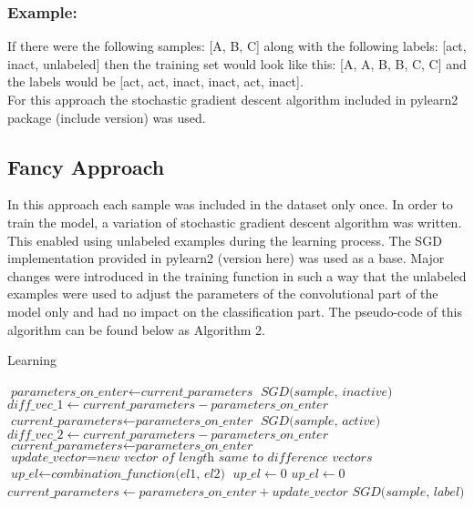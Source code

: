 \documentclass[a4paper,10pt]{report}
\begin{document}
      \subsubsection{Example:}
      If there were the following samples: [A, B, C] along with the following labels: [act, inact, unlabeled] then the training set would look like this: [A, A, B, B, C, C] and the labels would be [act, act, inact, inact, act, inact].\\
      
      For this approach the stochastic gradient descent algorithm included in pylearn2 package (include version) was used.\\
	  
      \subsection{Fancy Approach}
      In this approach each sample was included in the dataset only once. In order to train the model, a variation of stochastic gradient descent algorithm was written. This enabled using unlabeled examples during the learning process. The SGD implementation provided in pylearn2 (version here) was used as a base. Major changes were introduced in the training function in such a way that the unlabeled examples were used to adjust the parameters of the convolutional part of the model only and had no impact on the classification part. The pseudo-code of this algorithm can be found below as Algorithm 2.\\
      
      \begin{algorithm}
      \caption{Learning}\label{euclid}
      \begin{algorithmic}[1]
	\State $\textit{parameters\_on\_enter} \gets \textit{current\_parameters}$
	\State
	\State $\textit{SGD(sample, inactive)}$
	\State $\textit{diff\_vec\_1} \gets \textit{current\_parameters} -\textit{parameters\_on\_enter}$
	\State $\textit{current\_parameters} \gets \textit{parameters\_on\_enter}$
	\State
	\State $\textit{SGD(sample, active)}$
	\State $\textit{diff\_vec\_2} \gets \textit{current\_parameters} - \textit{parameters\_on\_enter}$
	\State $\textit{current\_parameters} \gets \textit{parameters\_on\_enter}$
	\State
	\State $\textit{update\_vector} = \textit{new vector of length same to difference vectors}$
	    \State $\textit{up\_el} \gets \textit{combination\_function(el1, el2)}$
	  \Else
	    \State $\textit{up\_el} \gets 0$
	  \EndIf
	\EndFor
	\State
	    \State $\textit{up\_el} \gets 0$
	  \EndIf
	\EndFor
	\State
	\State $\textit{current\_parameters} \gets \textit{parameters\_on\_enter} + \textit{update\_vector}$
	\Else
	\State $\textit{SGD(sample, label)}$
      \EndIf
      \State
      \EndProcedure
      \end{algorithmic}
      \end{algorithm}
      
\end{document}
